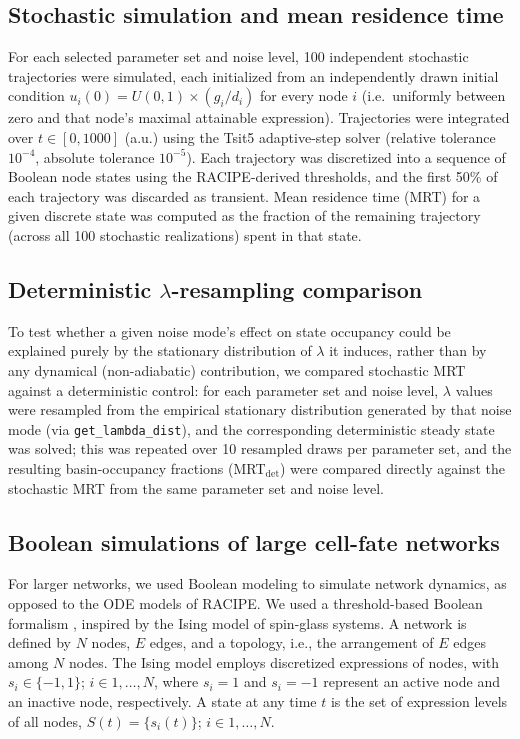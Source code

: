 \documentclass[11pt]{article}
\begin{document}
\subsection{Stochastic simulation and mean residence time}

For each selected parameter set and noise level, 100 independent stochastic trajectories were simulated, each initialized from an independently drawn initial condition $u_i(0) = U(0,1) \times (g_i/d_i)$ for every node $i$ (i.e.\ uniformly between zero and that node's maximal attainable expression). Trajectories were integrated over $t \in [0, 1000]$ (a.u.) using the Tsit5 adaptive-step solver (relative tolerance $10^{-4}$, absolute tolerance $10^{-5}$). Each trajectory was discretized into a sequence of Boolean node states using the RACIPE-derived thresholds, and the first 50\% of each trajectory was discarded as transient. Mean residence time (MRT) for a given discrete state was computed as the fraction of the remaining trajectory (across all 100 stochastic realizations) spent in that state.

\subsection{Deterministic $\lambda$-resampling comparison}

To test whether a given noise mode's effect on state occupancy could be explained purely by the stationary distribution of $\lambda$ it induces, rather than by any dynamical (non-adiabatic) contribution, we compared stochastic MRT against a deterministic control: for each parameter set and noise level, $\lambda$ values were resampled from the empirical stationary distribution generated by that noise mode (via \texttt{get\_lambda\_dist}), and the corresponding deterministic steady state was solved; this was repeated over 10 resampled draws per parameter set, and the resulting basin-occupancy fractions (MRT$_{\text{det}}$) were compared directly against the stochastic MRT from the same parameter set and noise level.


\subsection{Boolean simulations of large cell-fate networks}

For larger networks, we used Boolean modeling to simulate network dynamics, as opposed to the ODE models of RACIPE. We used a threshold-based Boolean formalism \cite{FontClos2018}, inspired by the Ising model of spin-glass systems. A network is defined by $N$ nodes, $E$ edges, and a topology, i.e., the arrangement of $E$ edges among $N$ nodes. The Ising model employs discretized expressions of nodes, with $s_i \in \{-1, 1\}$; $i \in 1, \ldots, N$, where $s_i = 1$ and $s_i = -1$ represent an active node and an inactive node, respectively. A state at any time $t$ is the set of expression levels of all nodes, $S(t) = \{s_i(t)\}$; $i \in 1, \ldots, N$.
\end{document}

